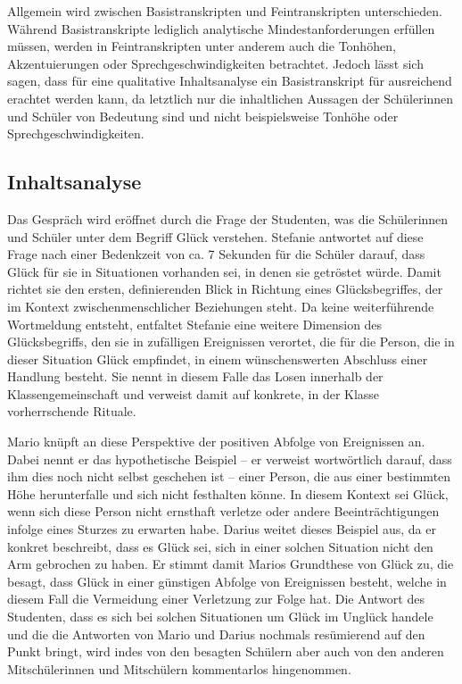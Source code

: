 Allgemein wird zwischen Basistranskripten und Feintranskripten unterschieden. 
Während Basistranskripte lediglich analytische Mindestanforderungen erfüllen müssen, werden in Feintranskripten unter anderem auch die Tonhöhen, Akzentuierungen oder Sprechgeschwindigkeiten betrachtet.
Jedoch lässt sich sagen, dass für eine qualitative Inhaltsanalyse ein Basistranskript für ausreichend erachtet werden kann, da letztlich nur die inhaltlichen Aussagen der Schülerinnen und Schüler von Bedeutung sind und nicht beispielsweise Tonhöhe oder Sprechgeschwindigkeiten.


\newpage


\subsection{Inhaltsanalyse}

Das Gespräch wird eröffnet durch die Frage der Studenten, was die Schülerinnen und Schüler unter dem Begriff Glück verstehen. 
Stefanie antwortet auf diese Frage nach einer Bedenkzeit von ca. 7 Sekunden für die Schüler darauf, dass Glück für sie in Situationen vorhanden sei, in denen sie getröstet würde. 
Damit richtet sie den ersten, definierenden Blick in Richtung eines Glücksbegriffes, der im Kontext zwischenmenschlicher Beziehungen steht. 
Da keine weiterführende Wortmeldung entsteht, entfaltet Stefanie eine weitere Dimension des Glücksbegriffs, den sie in zufälligen Ereignissen verortet, die für die Person, die in dieser Situation Glück empfindet, in einem wünschenswerten Abschluss einer Handlung besteht. 
Sie nennt in diesem Falle das Losen innerhalb der Klassengemeinschaft und verweist damit auf konkrete, in der Klasse vorherrschende Rituale. 

Mario knüpft an diese Perspektive der positiven Abfolge von Ereignissen an. 
Dabei nennt er das hypothetische Beispiel -- er verweist wortwörtlich darauf, dass ihm dies noch nicht selbst geschehen ist -- einer Person, die aus einer bestimmten Höhe herunterfalle und sich nicht festhalten könne. 
In diesem Kontext sei Glück, wenn sich diese Person nicht ernsthaft verletze oder andere Beeinträchtigungen infolge eines Sturzes zu erwarten habe. 
Darius weitet dieses Beispiel aus, da er konkret beschreibt, dass es Glück sei, sich in einer solchen Situation nicht den Arm gebrochen zu haben.
Er stimmt damit Marios Grundthese von Glück zu, die besagt, dass Glück in einer günstigen Abfolge von Ereignissen besteht, welche in diesem Fall die Vermeidung einer Verletzung zur Folge hat. 
Die Antwort des Studenten, dass es sich bei solchen Situationen um Glück im Unglück handele und die die Antworten von Mario und Darius nochmals resümierend auf den Punkt bringt, wird indes von den besagten Schülern aber auch von den anderen Mitschülerinnen und Mitschülern kommentarlos hingenommen.

